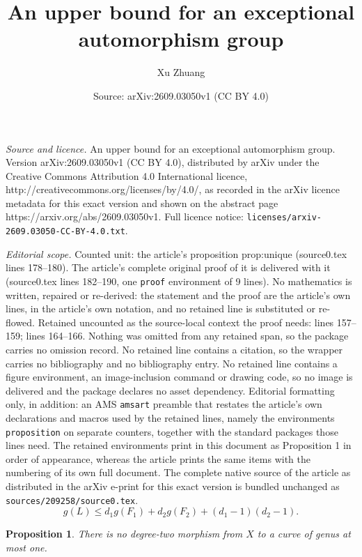 \documentclass[10pt,a4paper]{amsart}
\title{An upper bound for an exceptional automorphism group}
\author{Xu Zhuang}
\date{Source: arXiv:2609.03050v1 (CC BY 4.0)}
\newtheorem{proposition}{Proposition}
\begin{document}
\maketitle

\noindent\emph{Source and licence.} An upper bound for an exceptional automorphism group. Version arXiv:2609.03050v1 (CC BY 4.0), distributed by arXiv under the Creative Commons Attribution 4.0 International licence, http://creativecommons.org/licenses/by/4.0/, as recorded in the arXiv licence metadata for this exact version and shown on the abstract page https://arxiv.org/abs/2609.03050v1. Full licence notice: \texttt{licenses/arxiv-2609.03050-CC-BY-4.0.txt}.\par\smallskip

\noindent\textit{Editorial scope.} Counted unit: the article's proposition prop:unique (source0.tex lines 178--180). The article's complete original proof of it is delivered with it (source0.tex lines 182--190, one \texttt{proof} environment of 9 lines). No mathematics is written, repaired or re-derived: the statement and the proof are the article's own lines, in the article's own notation, and no retained line is substituted or re-flowed.  Retained uncounted as the source-local context the proof needs: lines 157--159; lines 164--166.  Nothing was omitted from any retained span, so the package carries no omission record.  No retained line contains a citation, so the wrapper carries no bibliography and no bibliography entry.  No retained line contains a figure environment, an image-inclusion command or drawing code, so no image is delivered and the package declares no asset dependency.  Editorial formatting only, in addition: an AMS \texttt{amsart} preamble that restates the article's own declarations and macros used by the retained lines, namely the environments \texttt{proposition} on separate counters, together with the standard packages those lines need.  The retained environments print in this document as Proposition 1 in order of appearance, whereas the article prints the same items with the numbering of its own full document.  The complete native source of the article as distributed in the arXiv e-print for this exact version is bundled unchanged as \texttt{sources/209258/source0.tex}.
\begin{equation}\label{eq:CS}
  g(L)\leq d_1g(F_1)+d_2g(F_2)+(d_1-1)(d_2-1).
\end{equation}

\begin{proposition}\label{prop:no-low-genus}
There is no degree-two morphism from $X$ to a curve of genus at most one.
\end{proposition}
\end{document}

